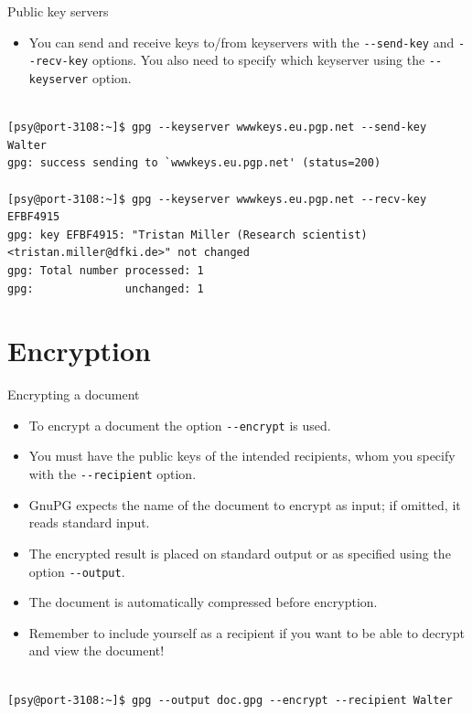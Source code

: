 \documentclass[%
mode=present,%
paper=screen%
]{powerdot}
\newcommand{\clopt}[1]{\texttt{{-}#1}}
\begin{document}
\begin{slide}[method=direct,toc=]{Public key servers}
  \begin{itemize}
  \item You can send and receive keys to/from keyservers with the
    \clopt{-send-key} and \clopt{-recv-key} options.  You also need to
    specify which keyserver using the \clopt{-keyserver} option.
  \end{itemize}
\begin{verbatim}

[psy@port-3108:~]$ gpg --keyserver wwwkeys.eu.pgp.net --send-key Walter
gpg: success sending to `wwwkeys.eu.pgp.net' (status=200)

[psy@port-3108:~]$ gpg --keyserver wwwkeys.eu.pgp.net --recv-key EFBF4915
gpg: key EFBF4915: "Tristan Miller (Research scientist) <tristan.miller@dfki.de>" not changed
gpg: Total number processed: 1
gpg:              unchanged: 1
\end{verbatim}
\end{slide}

\section{Encryption}

\makeatletter\renewcommand{\verbatim@font}{\scriptsize\tt}\makeatother
\begin{slide}[method=direct]{Encrypting a document}
  \begin{itemize}
  \item To encrypt a document the option \clopt{-encrypt} is used.
  \item You must have the public keys of the intended recipients, whom
    you specify with the \clopt{-recipient} option.
  \item GnuPG expects the name of the document to encrypt as input; if
    omitted, it reads standard input.
  \item The encrypted result is placed on standard output or as
    specified using the option \clopt{-output}.
  \item The document is automatically compressed before encryption.
  \item Remember to include yourself as a recipient if you want to be
    able to decrypt and view the document!
  \end{itemize}
\begin{verbatim}

[psy@port-3108:~]$ gpg --output doc.gpg --encrypt --recipient Walter
\end{verbatim}%
\end{slide}
\end{document}
